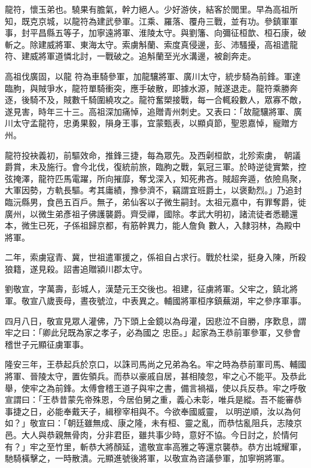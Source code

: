 \begin{pinyinscope}
 龍符，懷玉弟也。驍果有膽氣，幹力絕人。少好游俠，結客於閭里。早為高祖所知，既克京城，以龍符為建武參軍。江乘、羅落、覆舟三戰，並有功。參鎮軍軍事，封平昌縣五等子，加寧遠將軍、淮陵太守。與劉籓、向彌征桓歆、桓石康，破斬之。除建威將軍、東海太守。索虜斛蘭、索度真侵邊，彭、沛騷擾，高祖遣龍符、建威將軍道憐北討，一戰破之。追斛蘭至光水溝邊，被創奔走。



 高祖伐廣固，以龍
 符為車騎參軍，加龍驤將軍、廣川太守，統步騎為前鋒。軍達臨朐，與賊爭水，龍符單騎衝突，應手破散，即據水源，賊遂退走。龍符乘勝奔逐，後騎不及，賊數千騎圍繞攻之。龍符奮槊接戰，每一合輒殺數人，眾寡不敵，遂見害，時年三十三。高祖深加痛悼，追贈青州刺史。又表曰：「故龍驤將軍、廣川太守孟龍符，忠勇果毅，隕身王事，宜蒙甄表，以顯貞節，聖恩嘉悼，寵贈方州。



 龍符投袂義初，前驅效命，推鋒三捷，每為眾先。及西劋桓歆，北殄索虜，
 朝議爵賞，未及施行。會今北伐，復統前旅，臨朐之戰，氣冠三軍。於時逆徒實繁，控弦掩澤，龍符匹馬電躍，所向摧靡，奪戈深入，知死弗吝。賊超奔遁，依險鳥聚，大軍因勢，方軌長驅。考其庸績，豫參濟不，竊謂宜班爵土，以褒勳烈。」乃追封臨沅縣男，食邑五百戶。無子，弟仙客以子微生嗣封。太祖元嘉中，有罪奪爵，徙廣州，以微生弟彥祖子佛護襲爵。齊受禪，國除。孝武大明初，諸流徒者悉聽還本，微生已死，子係祖歸京都，有筋幹異力，能人詹負
 數人，入隸羽林，為殿中將軍。



 二年，索虜寇青、冀，世祖遣軍援之，係祖自占求行。戰於杜梁，挺身入陳，所殺狼籍，遂見殺。詔書追贈潁川郡太守。



 劉敬宣，字萬壽，彭城人，漢楚元王交後也。祖建，征虜將軍。父牢之，鎮北將軍。敬宣八歲喪母，晝夜號泣，中表異之。輔國將軍桓序鎮蕪湖，牢之參序軍事。



 四月八日，敬宣見眾人灌佛，乃下頭上金鏡以為母灌，因悲泣不自勝，序歎息，謂牢之曰：「卿此兒既為家之孝子，必為國之
 忠臣。」起家為王恭前軍參軍，又參會稽世子元顯征虜軍事。



 隆安三年，王恭起兵於京口，以誅司馬尚之兄弟為名。牢之時為恭前軍司馬、輔國將軍、晉陵太守，置佐領兵。而恭以豪戚自居，甚相陵忽，牢之心不能平。及恭此舉，使牢之為前鋒。太傅會稽王道子與牢之書，備言禍福，使以兵反恭。牢之呼敬宣謂曰：「王恭昔蒙先帝殊恩，今居伯舅之重，義心未彰，唯兵是縱。吾不能審恭事捷之日，必能奉戴天子，緝穆宰相與不。今欲奉國威靈，
 以明逆順，汝以為何如？」敬宣曰：「朝廷雖無成、康之隆，未有桓、靈之亂，而恭怙亂阻兵，志陵京邑。大人與恭親無骨肉，分非君臣，雖共事少時，意好不協。今日討之，於情何有？」牢之至竹里，斬恭大將顏延，遣敬宣率高雅之等還京襲恭。恭方出城耀軍，馳騎橫擊之，一時散潰。元顯進號後將軍，以敬宣為咨議參軍，加寧朔將軍。




\end{pinyinscope}
